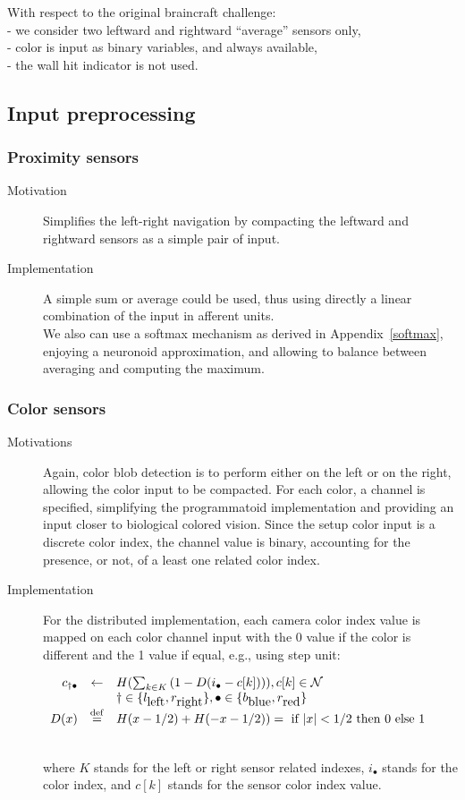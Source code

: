 \documentclass[a4]{article}
\newcommand{\eqline}[1]{~\vspace{0.1cm}\\\centerline{$#1$}\vspace{0.1cm}\\}
\newcommand{\defq}{\stackrel {\rm def}{=}}
\newcommand{\tab}{\hphantom{4mm}}
\begin{document}
With respect to the original braincraft challenge:
\\ \tab - we consider two leftward and rightward ``average'' sensors only,
\\ \tab - color is input as binary variables, and always available,
\\ \tab - the wall hit indicator is not used.

\subsection{Input preprocessing}

\subsubsection{Proximity sensors}\begin{description}
\item[Motivation] Simplifies the left-right navigation by compacting the leftward and rightward sensors as a simple pair of input.
\item[Implementation] A simple sum or average could be used, thus using directly a linear combination of the input in afferent units. \\
We also can use a softmax mechanism as derived in Appendix~\ref{softmax}, enjoying a neuronoid approximation, and allowing to balance between averaging and computing the maximum.
\end{description}

\subsubsection{Color sensors}\begin{description}
\item[Motivations] Again, color blob detection is to perform either on the left or on the right, allowing the color input to be compacted. For each color, a channel is specified, simplifying the programmatoid implementation and providing an input closer to biological colored vision. Since the setup color input is a discrete color index, the channel value is binary, accounting for the presence, or not, of a least one related color index.  
\item[Implementation] For the distributed implementation, each camera color index value is mapped on each color channel input with the 0 value if the color is different and the 1 value if equal, e.g., using step unit: \eqline{\begin{array}{rcl}
    c_{\dagger\bullet} &\leftarrow& H(\sum_{k \in K}  \, (1 - D(i_{\bullet} - c[k]))), c[k] \in {\cal N}\\
    && \dagger \in \{l_{\mbox{left}}, r_{\mbox{right}}\}, \bullet \in \{b_{\mbox{blue}}, r_{\mbox{red}}\} \\
    D(x) &\defq& H(x-1/2) + H(-x-1/2)) = \mbox{ if } |x| < 1/2 \mbox{ then } 0 \mbox{ else } 1 \\
\end{array}}
 where $K$ stands for the left or right sensor related indexes, $i_{\bullet}$ stands for the color index, and $c[k]$ stands for the sensor color index value.
\end{description}
\end{document}

